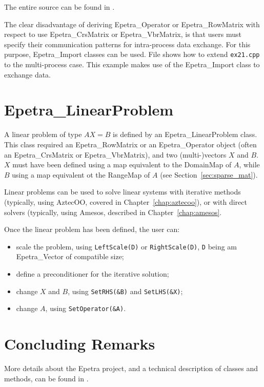The entire source can be found in
. 

\begin{remark}
  The clear disadvantage of deriving Epetra\_Operator or
  Epetra\_RowMatrix with respect to use Epetra\_CrsMatrix or
  Epetra\_VbrMatrix, is that users must specify their communication
  patterns for intra-process data exchange. For this purpose,
  Epetra\_Import classes can be used.  File 
  shows how to extend \verb!ex21.cpp! to the multi-process case. This
  example makes use of the Epetra\_Import class to exchange data.
\end{remark}


\section{Epetra\_LinearProblem}
\label{sec:linear_problem}

A linear problem of type $A X = B$ is defined by an
Epetra\_LinearProblem class. This class required an Epetra\_RowMatrix or
an Epetra\_Operator object (often an Epetra\_CrsMatrix or
Epetra\_VbrMatrix), and two (multi-)vectors $X$ and $B$. $X$ must have
been defined using a map equivalent to the DomainMap of $A$, while $B$
using a map equivalent ot the RangeMap of $A$ (see
Section~\ref{sec:sparse_mat}).

Linear problems can be used to solve linear systems with iterative
methods (typically, using AztecOO, covered in
Chapter~\ref{chap:aztecoo}), or with direct solvers (typically, using
Amesos, described in Chapter~\ref{chap:amesos}. 

Once the linear problem has been defined, the user can:

\begin{itemize}
\item scale the problem, using \verb!LeftScale(D)! or
  \verb!RightScale(D)!, \verb!D! being am Epetra\_Vector of compatible
  size;
\item define a preconditioner for the iterative solution;
\item change $X$ and $B$, using \verb!SetRHS(&B)! and \verb!SetLHS(&X)!;
\item change $A$, using \verb!SetOperator(&A)!.
\end{itemize}



\section{Concluding Remarks}
\label{sec:epetra_concluding}

More details about the Epetra project, and a technical description of
classes and methods, can be found in
\cite{Epetra-Ref-Guide,Epetra-Users-Guide}.

